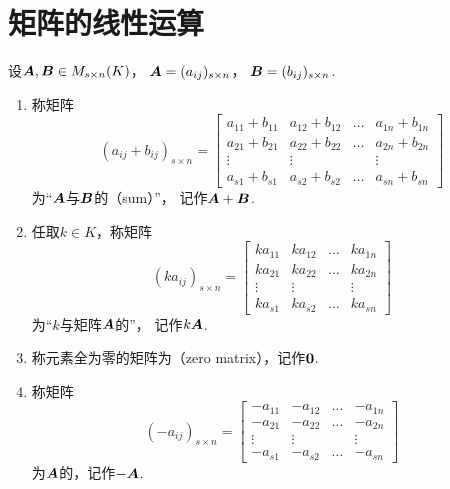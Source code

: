 \section{矩阵的线性运算}
\begin{definition}
设\(\boldsymbol{A},\boldsymbol{B}\in M_{s\times n}(K)\)，
\(\boldsymbol{A}=(a_{ij})_{s \times n}\)，
\(\boldsymbol{B}=(b_{ij})_{s \times n}\).
\begin{enumerate}
	\item 称矩阵\begin{equation*}
		(a_{ij} + b_{ij})_{s \times n} = \begin{bmatrix}
			a_{11}+b_{11} & a_{12}+b_{12} & \dots & a_{1n}+b_{1n} \\
			a_{21}+b_{21} & a_{22}+b_{22} & \dots & a_{2n}+b_{2n} \\
			\vdots & \vdots & & \vdots \\
			a_{s1}+b_{s1} & a_{s2}+b_{s2} & \dots & a_{sn}+b_{sn}
		\end{bmatrix}
	\end{equation*}为“\(\boldsymbol{A}\)与\(\boldsymbol{B}\)的（sum）”，
	记作\(\boldsymbol{A}+\boldsymbol{B}\).

	\item 任取\(k\in K\)，称矩阵\begin{equation*}
		(ka_{ij})_{s \times n} = \begin{bmatrix}
			ka_{11} & ka_{12} & \dots & ka_{1n} \\
			ka_{21} & ka_{22} & \dots & ka_{2n} \\
			\vdots & \vdots & & \vdots \\
			ka_{s1} & ka_{s2} & \dots & ka_{sn}
		\end{bmatrix}
	\end{equation*}为“\(k\)与矩阵\(\boldsymbol{A}\)的”，
	记作\(k\boldsymbol{A}\).

	\item 称元素全为零的矩阵为（zero matrix），记作\(\boldsymbol0\).

	\item 称矩阵\begin{equation*}
		(-a_{ij})_{s \times n}=\begin{bmatrix}
			-a_{11} & -a_{12} & \dots & -a_{1n} \\
			-a_{21} & -a_{22} & \dots & -a_{2n} \\
			\vdots & \vdots & & \vdots \\
			-a_{s1} & -a_{s2} & \dots & -a_{sn}
		\end{bmatrix}
	\end{equation*}为\(\boldsymbol{A}\)的，记作\(-\boldsymbol{A}\).
\end{enumerate}
\end{definition}

